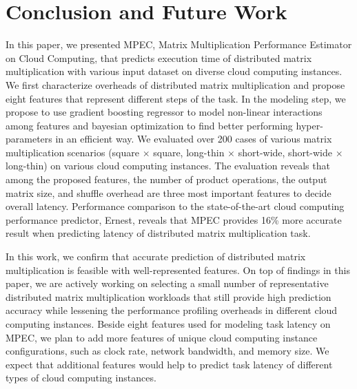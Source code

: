 \documentclass[10pt, conference, compsocconf]{IEEEtran}
\begin{document}
\section{Conclusion and Future Work}
In this paper, we presented MPEC, Matrix Multiplication Performance Estimator on Cloud Computing, that predicts execution time of distributed matrix multiplication with various input dataset on diverse cloud computing instances. We first characterize overheads of distributed matrix multiplication and propose eight features that represent different steps of the task. In the modeling step, we propose to use gradient boosting regressor to model non-linear interactions among features and bayesian optimization to find better performing hyper-parameters in an efficient way. We evaluated over 200 cases of various matrix multiplication scenarios (square $\times$ square, long-thin $\times$ short-wide, short-wide $\times$ long-thin) on various cloud computing instances. The evaluation reveals that among the proposed features, the number of product operations, the output matrix size, and shuffle overhead are three most important features to decide overall latency. Performance comparison to the state-of-the-art cloud computing performance predictor, Ernest, reveals that MPEC provides 16\% more accurate result when predicting latency of distributed matrix multiplication task.

In this work, we confirm that accurate prediction of distributed matrix multiplication is feasible with well-represented features. On top of findings in this paper, we are actively working on selecting a small number of representative distributed matrix multiplication workloads that still provide high prediction accuracy while lessening the performance profiling overheads in different cloud computing instances. Beside eight features used for modeling task latency on MPEC, we plan to add more features of unique cloud computing instance configurations, such as clock rate, network bandwidth, and memory size. We expect that additional features would help to predict task latency of different types of cloud computing instances.


\end{document}
